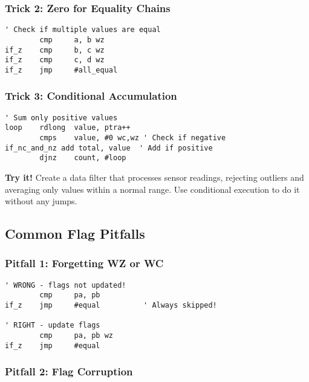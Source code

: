 \documentclass[11pt]{book}
\begin{document}
\hypertarget{trick-2-zero-for-equality-chains}{%
\subsubsection{Trick 2: Zero for Equality
Chains}\label{trick-2-zero-for-equality-chains}}

\begin{lstlisting}
' Check if multiple values are equal
        cmp     a, b wz
if_z    cmp     b, c wz
if_z    cmp     c, d wz
if_z    jmp     #all_equal
\end{lstlisting}

\hypertarget{trick-3-conditional-accumulation}{%
\subsubsection{Trick 3: Conditional
Accumulation}\label{trick-3-conditional-accumulation}}

\begin{lstlisting}
' Sum only positive values
loop    rdlong  value, ptra++
        cmps    value, #0 wc,wz ' Check if negative
if_nc_and_nz add total, value  ' Add if positive
        djnz    count, #loop
\end{lstlisting}

\textbf{Try it!} Create a data filter that processes sensor readings,
rejecting outliers and averaging only values within a normal range. Use
conditional execution to do it without any jumps.

\hypertarget{common-flag-pitfalls}{%
\subsection{Common Flag Pitfalls}\label{common-flag-pitfalls}}

\hypertarget{pitfall-1-forgetting-wz-or-wc}{%
\subsubsection{Pitfall 1: Forgetting WZ or
WC}\label{pitfall-1-forgetting-wz-or-wc}}

\begin{lstlisting}
' WRONG - flags not updated!
        cmp     pa, pb
if_z    jmp     #equal          ' Always skipped!

' RIGHT - update flags
        cmp     pa, pb wz
if_z    jmp     #equal
\end{lstlisting}

\hypertarget{pitfall-2-flag-corruption}{%
\subsubsection{Pitfall 2: Flag
Corruption}\label{pitfall-2-flag-corruption}}
\end{document}
